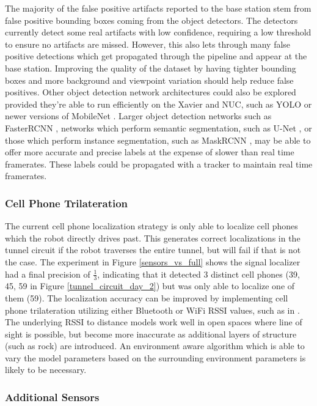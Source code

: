 The majority of the false positive artifacts reported to the base station stem from false positive bounding boxes coming from the object detectors. The detectors currently detect some real artifacts with low confidence, requiring a low threshold to ensure no artifacts are missed. However, this also lets through many false positive detections which get propagated through the pipeline and appear at the base station. Improving the quality of the dataset by having tighter bounding boxes and more background and viewpoint variation should help reduce false positives. Other object detection network architectures could also be explored provided they're able to run efficiently on the Xavier and NUC, such as YOLO \cite{redmon2018yolov3} or newer versions of MobileNet \cite{howard2019searching}. Larger object detection networks such as FasterRCNN \cite{ren2015faster}, networks which perform semantic segmentation, such as U-Net \cite{ronneberger2015u}, or those  which perform instance segmentation, such as MaskRCNN \cite{he2017mask}, may be able to offer more accurate and precise labels at the expense of slower than real time framerates. These labels could be propagated with a tracker to maintain real time framerates.

\subsubsection{Cell Phone Trilateration}

The current cell phone localization strategy is only able to localize cell phones which the robot directly drives past. This generates correct localizations in the tunnel circuit if the robot traverses the entire tunnel, but will fail if that is not the case. The experiment in Figure \ref{sensors_vs_full} shows the signal localizer had a final precision of $\frac{1}{3}$, indicating that it detected 3 distinct cell phones (39, 45, 59 in Figure \ref{tunnel_circuit_day_2}) but was only able to localize one of them (59). The localization accuracy can be improved by implementing cell phone trilateration utilizing either Bluetooth or WiFi RSSI values, such as in \cite{iglesias2012indoor}. The underlying RSSI to distance models work well in open spaces where line of sight is possible, but become more inaccurate as additional layers of structure (such as rock) are introduced. An environment aware algorithm which is able to vary the model parameters based on the surrounding environment parameters is likely to be necessary.

\subsubsection{Additional Sensors}

